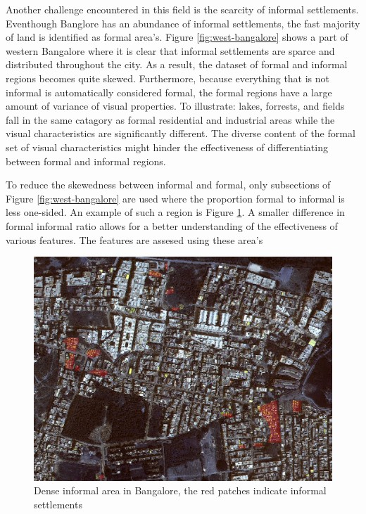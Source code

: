 Another challenge encountered in this field is the scarcity of informal
settlements.  Eventhough Banglore  has an abundance of informal settlements,
the fast majority of land is identified as formal area's. Figure
\ref{fig:west-bangalore} shows a part of western Bangalore where it is clear
that informal settlements are sparce and distributed throughout the city. As
a result, the dataset of formal and informal regions becomes quite skewed.
Furthermore, because everything that is not informal is automatically
considered formal, the formal regions have a large amount of variance of visual
properties.  To illustrate: lakes, forrests, and fields fall in the same
catagory as formal residential and industrial areas while the visual
characteristics are significantly different. The diverse content of the formal
set of visual characteristics might hinder the effectiveness of differentiating
between formal and informal regions. 

To reduce the skewedness between informal and formal, only subsections of Figure \ref{fig:west-bangalore} are
used where the proportion formal to informal is less one-sided. An example of
such a region is Figure \ref{fig:section_3}. A smaller difference in formal
informal ratio allows for a better understanding of the effectiveness of
various features. The features are assesed using these area's 

\begin{figure}
\centering
  \includegraphics[width=\linewidth]{images/section_3}
  \caption{Dense informal area in Bangalore, the red patches indicate informal
  settlements}
  \label{fig:section_3}
\end{figure}


